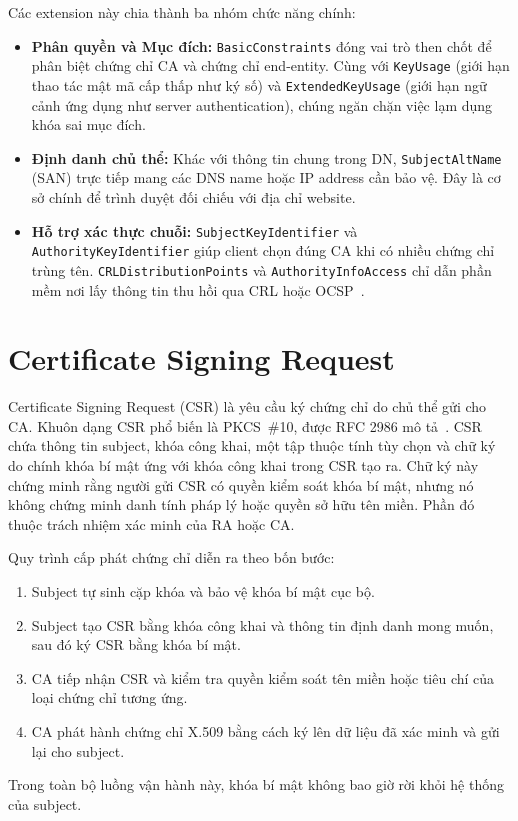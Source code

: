 Các extension này chia thành ba nhóm chức năng chính:
\begin{itemize}
    \item \textbf{Phân quyền và Mục đích:} \texttt{BasicConstraints} đóng vai trò then chốt để phân biệt chứng chỉ CA và chứng chỉ end-entity. Cùng với \texttt{KeyUsage} (giới hạn thao tác mật mã cấp thấp như ký số) và \texttt{ExtendedKeyUsage} (giới hạn ngữ cảnh ứng dụng như server authentication), chúng ngăn chặn việc lạm dụng khóa sai mục đích.
    \item \textbf{Định danh chủ thể:} Khác với thông tin chung trong DN, \texttt{SubjectAltName} (SAN) trực tiếp mang các DNS name hoặc IP address cần bảo vệ. Đây là cơ sở chính để trình duyệt đối chiếu với địa chỉ website.
    \item \textbf{Hỗ trợ xác thực chuỗi:} \texttt{SubjectKeyIdentifier} và \texttt{AuthorityKeyIdentifier} giúp client chọn đúng CA khi có nhiều chứng chỉ trùng tên. \texttt{CRLDistributionPoints} và \texttt{AuthorityInfoAccess} chỉ dẫn phần mềm nơi lấy thông tin thu hồi qua CRL hoặc OCSP~\cite{RFC6960}.
\end{itemize}

\section{Certificate Signing Request}
\label{sec:4.5}

Certificate Signing Request (CSR) là yêu cầu ký chứng chỉ do chủ
thể gửi cho CA. Khuôn dạng CSR phổ biến là PKCS~\#10, được RFC
2986 mô tả~\cite{RFC2986}. CSR chứa thông tin subject, khóa công
khai, một tập thuộc tính tùy chọn và chữ ký do chính khóa bí mật
ứng với khóa công khai trong CSR tạo ra. Chữ ký này chứng minh
rằng người gửi CSR có quyền kiểm soát khóa bí mật, nhưng nó không
chứng minh danh tính pháp lý hoặc quyền sở hữu tên miền. Phần đó
thuộc trách nhiệm xác minh của RA hoặc CA.

Quy trình cấp phát chứng chỉ diễn ra theo bốn bước:
\begin{enumerate}
    \item Subject tự sinh cặp khóa và bảo vệ khóa bí mật cục bộ.
    \item Subject tạo CSR bằng khóa công khai và thông tin định danh mong muốn, sau đó ký CSR bằng khóa bí mật.
    \item CA tiếp nhận CSR và kiểm tra quyền kiểm soát tên miền hoặc tiêu chí của loại chứng chỉ tương ứng.
    \item CA phát hành chứng chỉ X.509 bằng cách ký lên dữ liệu đã xác minh và gửi lại cho subject.
\end{enumerate}
Trong toàn bộ luồng vận hành này, khóa bí mật không bao giờ rời khỏi hệ thống của subject.

